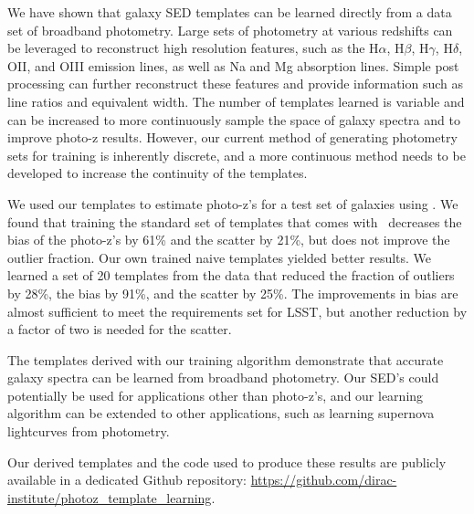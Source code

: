 
\label{sect:conclusion}

We have shown that galaxy SED templates can be learned directly from a data set of broadband photometry.
Large sets of photometry at various redshifts can be leveraged to reconstruct high resolution features, such as the H$\alpha$, H$\beta$, H$\gamma$, H$\delta$, OII, and OIII emission lines, as well as Na and Mg absorption lines.
Simple post processing can further reconstruct these features and provide information such as line ratios and equivalent width.
The number of templates learned is variable and can be increased to more continuously sample the space of galaxy spectra and to improve photo-z results.
However, our current method of generating photometry sets for training is inherently discrete, and a more continuous method needs to be developed to increase the continuity of the templates.

We used our templates to estimate photo-z's for a test set of galaxies using \bpz.
We found that training the standard set of templates that comes with \bpz\ decreases the bias of the photo-z's by 61\% and the scatter by 21\%, but does not improve the outlier fraction.
Our own trained naive templates yielded better results.
We learned a set of 20 templates from the data that reduced the fraction of outliers by 28\%, the bias by 91\%, and the scatter by 25\%.
The improvements in bias are almost sufficient to meet the requirements set for LSST, but another reduction by a factor of two is needed for the scatter.

The templates derived with our training algorithm demonstrate that accurate galaxy spectra can be learned from broadband photometry.
Our SED's could potentially be used for applications other than photo-z's, and our learning algorithm can be extended to other applications, such as learning supernova lightcurves from photometry.

Our derived templates and the code used to produce these results are publicly available in a dedicated Github repository: \url{https://github.com/dirac-institute/photoz_template_learning}.